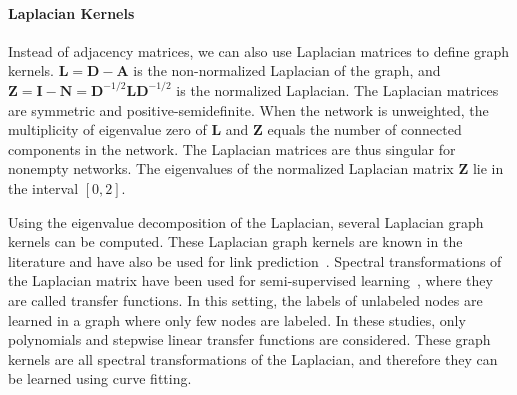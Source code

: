 \documentclass[11pt,a4paper]{book}
\begin{document}
\paragraph{Laplacian Kernels}
\label{sec:laplacian-kernels}
Instead of adjacency matrices, we can also use Laplacian matrices to
define graph kernels. 
$ \mathbf L = \mathbf D - \mathbf A$ is the non-normalized Laplacian of
the graph, and $\mathbf Z = \mathbf I-\mathbf N = \mathbf
D^{-1/2}\mathbf L\mathbf D^{-1/2}$ is the normalized Laplacian.  The
Laplacian matrices are symmetric and positive-semidefinite.
When the network is unweighted, the multiplicity of eigenvalue zero of
$\mathbf L$ and 
$\mathbf Z$ equals the number of connected components in the network.
The Laplacian matrices are thus singular for nonempty networks.  
The eigenvalues of the normalized Laplacian matrix $\mathbf Z$ lie in
the interval $[0, 2]$. 

Using the eigenvalue decomposition of the Laplacian, several Laplacian
graph kernels can be computed.  
These Laplacian graph kernels are known in the literature 
and have also be used for link prediction~\cite{b155}. 
Spectral transformations of the Laplacian matrix have been used for
semi-supervised learning~\cite{b550}, where they are called transfer
functions.  In this setting, the labels of unlabeled nodes are learned in
a graph where only few nodes are labeled. 
In these studies, only polynomials and stepwise linear
transfer functions are considered. 
These graph kernels are all spectral transformations of the Laplacian,
and therefore they can be learned using curve fitting.  
\end{document}
